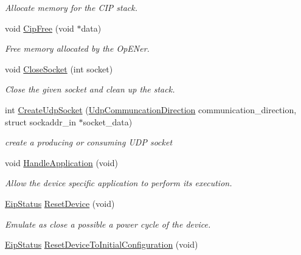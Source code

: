 \begin{DoxyCompactItemize}
\begin{DoxyCompactList}\small\item\em \-Allocate memory for the \-C\-I\-P stack. \end{DoxyCompactList}\item 
void \hyperlink{group__CIP__CALLBACK__API_ga729165f94320800eb9537def5a0e6af8}{\-Cip\-Free} (void $\ast$data)
\begin{DoxyCompactList}\small\item\em \-Free memory allocated by the \-Op\-E\-Ner. \end{DoxyCompactList}\item 
void \hyperlink{group__CIP__CALLBACK__API_ga89293c1274a9092dec6be806b8d0779f}{\-Close\-Socket} (int socket)
\begin{DoxyCompactList}\small\item\em \-Close the given socket and clean up the stack. \end{DoxyCompactList}\item 
int \hyperlink{group__CIP__CALLBACK__API_gadae462526ab01253d39e4a54346f56ca}{\-Create\-Udp\-Socket} (\hyperlink{typedefs_8h_a354b9a030f385814dac5d61a8eec2e42}{\-Udp\-Communcation\-Direction} communication\-\_\-direction, struct sockaddr\-\_\-in $\ast$socket\-\_\-data)
\begin{DoxyCompactList}\small\item\em create a producing or consuming \-U\-D\-P socket \end{DoxyCompactList}\item 
void \hyperlink{group__CIP__CALLBACK__API_ga6d2ccae9a19ce418c77941dbe22b008d}{\-Handle\-Application} (void)
\begin{DoxyCompactList}\small\item\em \-Allow the device specific application to perform its execution. \end{DoxyCompactList}\item 
\hyperlink{typedefs_8h_a3dcc5f7837c120360f8cc88a76781709}{\-Eip\-Status} \hyperlink{group__CIP__CALLBACK__API_gacfb8706d76bc6fe1816546e122fdcac2}{\-Reset\-Device} (void)
\begin{DoxyCompactList}\small\item\em \-Emulate as close a possible a power cycle of the device. \end{DoxyCompactList}\item 
\hyperlink{typedefs_8h_a3dcc5f7837c120360f8cc88a76781709}{\-Eip\-Status} \hyperlink{group__CIP__CALLBACK__API_gabec9a29cf19789a6534814680c21f6e7}{\-Reset\-Device\-To\-Initial\-Configuration} (void)

\end{DoxyCompactItemize}
